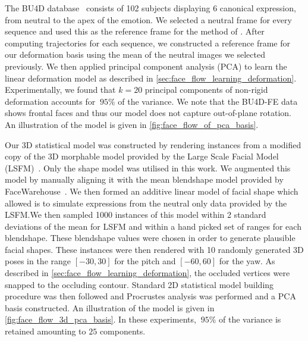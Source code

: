 The BU4D database~\cite{yin2008high} consists of 102 subjects displaying
6 canonical expression,
from neutral to the apex of the emotion. We selected a neutral frame for every
sequence and used this as the reference frame for the method of \citet{garg2013variational}.
After computing trajectories for each sequence,
we constructed a reference frame for our deformation basis using the mean
of the neutral images we selected previously. We then applied principal
component analysis (PCA) to learn the linear deformation model as described in
\cref{sec:face_flow_learning_deformation}.
Experimentally, we found that $k=20$ principal components of
non-rigid deformation accounts for $~95\%$ of the variance.
We note that the BU4D-FE data shows frontal faces and thus our model does not capture out-of-plane
rotation. An illustration of the model is given in \cref{fig:face_flow_of_pca_basis}.

Our 3D statistical model was constructed by rendering instances from a modified
copy of the 3D morphable model provided by the
Large Scale Facial Model (LSFM)~\cite{booth2016lsfm}. Only
the shape model was utilised in this work. We augmented this model by manually
aligning it with the mean blendshape model provided by
FaceWarehouse~\cite{Cao:2014gy}. We then formed an additive linear model
of facial shape which allowed is to simulate expressions from the neutral
only data provided by the LSFM.\@ We then sampled 1000 instances
of this model within 2 standard deviations of the mean for LSFM and within a
hand picked set of ranges for each blendshape. These blendshape values were
chosen in order to generate plausible facial shapes. These instances were
then rendered with 10 randomly generated 3D poses in the range $[-30, 30]$ for
the pitch and $[-60, 60]$ for the yaw. As described in
\cref{sec:face_flow_learning_deformation}, the occluded vertices were snapped
to the occluding contour. Standard 2D statistical model building procedure
was then followed and Procrustes analysis was performed and a PCA basis
constructed. An illustration of the model is given in \cref{fig:face_flow_3d_pca_basis}.
In these experiments, $~95\%$ of the variance is retained amounting to
$25$ components.
